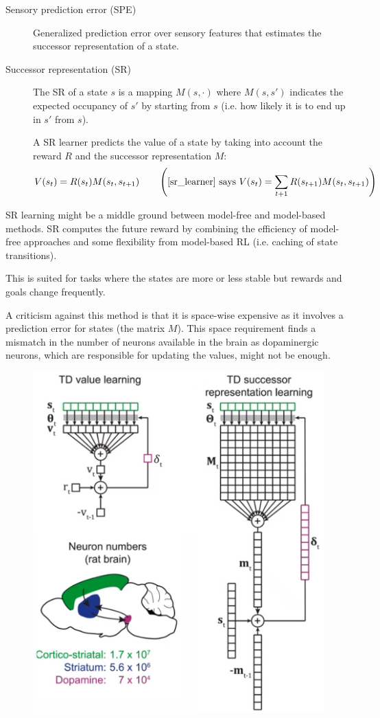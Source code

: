 \begin{description}
    \item[Sensory prediction error (SPE)] 
        Generalized prediction error over sensory features that estimates the successor representation of a state.

    \item[Successor representation (SR)] 
        The SR of a state $s$ is a mapping $M(s, \cdot)$ where $M(s, s')$ indicates the expected occupancy of $s'$ by starting from $s$ 
        (i.e. how likely it is to end up in $s'$ from $s$).

        A SR learner predicts the value of a state by taking into account the reward $R$ and the successor representation $M$:
        \[ 
            V(s_t) = R(s_{t}) M(s_t, s_{t+1}) 
            \hspace{2em}
            \left( \text{\cite{sr_learner} says } V(s_t) = \sum_{t+1} R(s_{t+1}) M(s_t, s_{t+1}) \right)
        \]
\end{description}

\begin{remark}
    SR learning might be a middle ground between model-free and model-based methods.
    SR computes the future reward by combining the efficiency of model-free approaches and some flexibility from model-based RL (i.e. caching of state transitions).

    This is suited for tasks where the states are more or less stable but rewards and goals change frequently.
\end{remark}

\begin{remark}
    A criticism against this method is that it is space-wise expensive as it involves a prediction error for states (the matrix $M$).
    This space requirement finds a mismatch in the number of neurons available in the brain as 
    dopaminergic neurons, which are responsible for updating the values, might not be enough.
    \begin{figure}[H]
        \centering
        \includegraphics[width=0.4\linewidth]{./img/sr_mismatch.png}
    \end{figure}
\end{remark}

